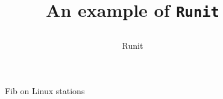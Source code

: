\documentclass[11pt]{article}
\begin{document}
\title{An example of \texttt{Runit}
\author{Runit}}
\maketitle

\begin{figure}[h]
\begin{center}
\begin{small}
\epsfxsize=10cm
\end{small}
\end{center}
\caption{Fib on Linux stations}
\end{figure}
\end{document}
